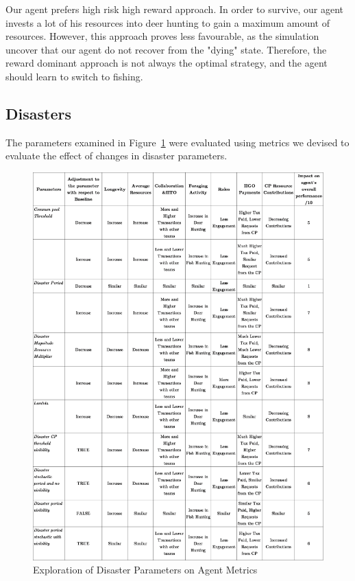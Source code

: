 Our agent prefers high risk high reward approach. In order to survive, our agent invests a lot of his resources into deer hunting to gain a maximum amount of resources. However, this approach proves less favourable, as the simulation uncover that our agent do not recover from the "dying" state. Therefore, the reward dominant approach is not always the optimal strategy, and the agent should learn to switch to fishing.


\subsection{Disasters}
The parameters examined in Figure~\ref{fig:DisasterParams} were evaluated using metrics we devised to evaluate the effect of changes in disaster parameters. 

\begin{figure}[!htb]
    \centering
    \includegraphics[width=1\textwidth]{13_team5_agentdesign/images/Sim.png}
    \caption{Exploration of Disaster Parameters on Agent Metrics}
    \label{fig:DisasterParams}
\end{figure}

